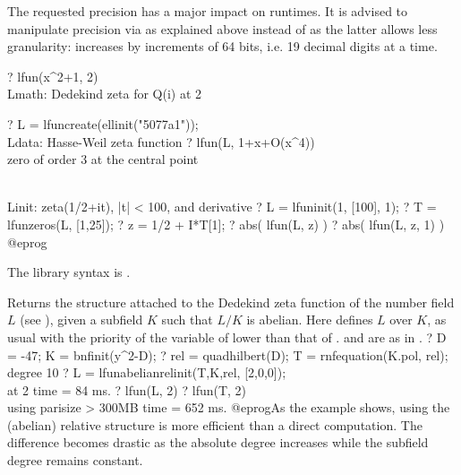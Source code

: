  The requested precision has a major impact on runtimes.
It is advised to manipulate precision via  as
 explained above instead of  as the latter allows less
granularity:  increases by increments of 64 bits, i.e. 19
decimal digits at a time.

\bprog
? lfun(x^2+1, 2)  \\ Lmath: Dedekind zeta for Q(i) at 2

? L = lfuncreate(ellinit("5077a1")); \\ Ldata: Hasse-Weil zeta function
? lfun(L, 1+x+O(x^4))  \\ zero of order 3 at the central point

\\ Linit: zeta(1/2+it), |t| < 100, and derivative
? L = lfuninit(1, [100], 1);
? T = lfunzeros(L, [1,25]);
? z = 1/2 + I*T[1];
? abs( lfun(L, z) )
? abs( lfun(L, z, 1) )
@eprog

The library syntax is .

\label{se:lfunabelianrelinit}
Returns the  structure attached to the Dedekind zeta function
 of the number field $L$ (see ), given a subfield $K$ such that
 $L/K$ is abelian.
 Here  defines $L$ over $K$, as usual with the priority of the
 variable of  lower than that of .
  and  are as in .
 \bprog
 ? D = -47; K = bnfinit(y^2-D);
 ? rel = quadhilbert(D); T = rnfequation(K.pol, rel); \\ degree 10
 ? L = lfunabelianrelinit(T,K,rel, [2,0,0]); \\ at 2
 time = 84 ms.
 ? lfun(L, 2)
 ? lfun(T, 2) \\ using parisize > 300MB
 time = 652 ms.
 @eprog\noindent As the example shows, using the (abelian) relative structure
 is more efficient than a direct computation. The difference becomes drastic
 as the absolute degree increases while the subfield degree remains constant.

